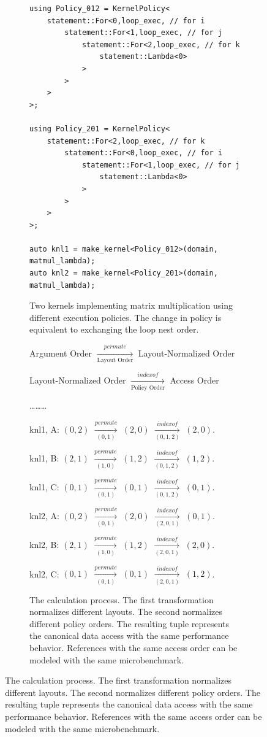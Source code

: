 \documentclass[sigconf,review=true]{acmart}
\begin{document}
\begin{figure}
\begin{subfigure}[b]{0.40\textwidth}
\begin{lstlisting}
using Policy_012 = KernelPolicy< 
	statement::For<0,loop_exec, // for i
		statement::For<1,loop_exec, // for j
			statement::For<2,loop_exec, // for k
				statement::Lambda<0>
			>
		>
	>
>;

using Policy_201 = KernelPolicy< 
	statement::For<2,loop_exec, // for k
		statement::For<0,loop_exec, // for i
			statement::For<1,loop_exec, // for j
				statement::Lambda<0>
			>
		>
	>
>;

auto knl1 = make_kernel<Policy_012>(domain, matmul_lambda);
auto knl2 = make_kernel<Policy_201>(domain, matmul_lambda);
		\end{lstlisting}
		\caption{Two kernels implementing matrix multiplication using different execution policies. The change in policy is equivalent to exchanging the loop nest order.}
		\label{accessOrder:code}
	\end{subfigure}
	\hspace{0.02\textwidth}
	\begin{subfigure}[b]{0.45\textwidth}
		\begin{center}
		Argument Order $\xrightarrow[\text{Layout Order}]{permute}$ Layout-Normalized Order

		Layout-Normalized Order $\xrightarrow[\text{Policy Order}]{indexof}$ Access Order

		\vspace{5px}
		\dots\dots\dots
		\vspace{5px}

		knl1, A: $(0,2)$ $\xrightarrow[(0,1)]{permute}$ $(2,0)$ $\xrightarrow[(0,1,2)]{indexof}$ $(2,0)$.
		
		knl1, B: $(2,1)$ $\xrightarrow[(1,0)]{permute}$ $(1,2)$ $\xrightarrow[(0,1,2)]{indexof}$ $(1,2)$.
		
		knl1, C: $(0,1)$ $\xrightarrow[(0,1)]{permute}$ $(0,1)$ $\xrightarrow[(0,1,2)]{indexof}$ $(0,1)$.
		
		knl2, A: $(0,2)$ $\xrightarrow[(0,1)]{permute}$ $(2,0)$ $\xrightarrow[(2,0,1)]{indexof}$ $(0,1)$.

		knl2, B: $(2,1)$ $\xrightarrow[(1,0)]{permute}$ $(1,2)$ $\xrightarrow[(2,0,1)]{indexof}$ $(2,0)$.

		knl2, C: $(0,1)$ $\xrightarrow[(0,1)]{permute}$ $(0,1)$ $\xrightarrow[(2,0,1)]{indexof}$ $(1,2)$.
	\end{center}
	\caption{The calculation process. The first transformation normalizes different layouts. The second normalizes different policy orders. The resulting tuple represents the canonical data access with the same performance behavior. References with the same access order can be modeled with the same microbenchmark.}
	\label{accessOrder:calc}
	\end{subfigure}


\end{figure}
\end{document}
